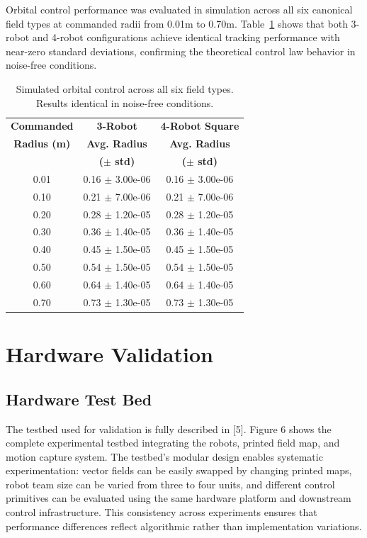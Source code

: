 \documentclass[lettersize,journal]{IEEEtran}
\begin{document}
Orbital control performance was evaluated in simulation across all six canonical field types at commanded radii from 0.01m to 0.70m. Table~\ref{tab:simulation_orbital_results} shows that both 3-robot and 4-robot configurations achieve identical tracking performance with near-zero standard deviations, confirming the theoretical control law behavior in noise-free conditions.

\begin{table}[h]
    \centering
    \begin{tabular}{ccc}
    \hline
    \textbf{Commanded} & \textbf{3-Robot} & \textbf{4-Robot Square} \\
    \textbf{Radius (m)} & \textbf{Avg. Radius} & \textbf{Avg. Radius} \\
     & \textbf{($\pm$ std)} & \textbf{($\pm$ std)} \\
    \hline
    0.01 & 0.16 $\pm$ 3.00e-06 & 0.16 $\pm$ 3.00e-06 \\
    0.10 & 0.21 $\pm$ 7.00e-06 & 0.21 $\pm$ 7.00e-06 \\
    0.20 & 0.28 $\pm$ 1.20e-05 & 0.28 $\pm$ 1.20e-05 \\
    0.30 & 0.36 $\pm$ 1.40e-05 & 0.36 $\pm$ 1.40e-05 \\
    0.40 & 0.45 $\pm$ 1.50e-05 & 0.45 $\pm$ 1.50e-05 \\
    0.50 & 0.54 $\pm$ 1.50e-05 & 0.54 $\pm$ 1.50e-05 \\
    0.60 & 0.64 $\pm$ 1.40e-05 & 0.64 $\pm$ 1.40e-05 \\
    0.70 & 0.73 $\pm$ 1.30e-05 & 0.73 $\pm$ 1.30e-05 \\
    \hline
    \end{tabular}
    \caption{Simulated orbital control across all six field types. Results identical in noise-free conditions.}
    \label{tab:simulation_orbital_results}
    \end{table}


\section{Hardware Validation}


\subsection{Hardware Test Bed}

The testbed used for validation is fully described in [5]. Figure 6 shows the complete experimental testbed integrating the robots, printed field map, and motion capture system. The testbed's modular design enables systematic experimentation: vector fields can be easily swapped by changing printed maps, robot team size can be varied from three to four units, and different control primitives can be evaluated using the same hardware platform and downstream control infrastructure. This consistency across experiments ensures that performance differences reflect algorithmic rather than implementation variations.
\end{document}

